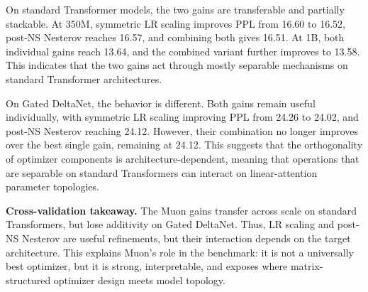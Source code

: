 
On standard Transformer models, the two gains are transferable and partially
stackable. At 350M, symmetric LR scaling improves PPL from 16.60 to 16.52,
post-NS Nesterov reaches 16.57, and combining both gives 16.51. At 1B, both
individual gains reach 13.64, and the combined variant further improves to
13.58. This indicates that the two gains act through mostly separable
mechanisms on standard Transformer architectures.

On Gated DeltaNet, the behavior is different. Both gains remain useful
individually, with symmetric LR scaling improving PPL from 24.26 to 24.02, and
post-NS Nesterov reaching 24.12. However, their combination no longer improves
over the best single gain, remaining at 24.12. This suggests that the
orthogonality of optimizer components is architecture-dependent, meaning that operations
that are separable on standard Transformers can interact on linear-attention
parameter topologies.

\begin{takeaway}
\noindent\textbf{Cross-validation takeaway.}
The Muon gains transfer across scale on standard Transformers, but lose
additivity on Gated DeltaNet. Thus, LR scaling and post-NS Nesterov are useful
refinements, but their interaction depends on the target architecture. This
explains Muon's role in the benchmark: it is not a universally best optimizer,
but it is strong, interpretable, and exposes where matrix-structured optimizer
design meets model topology.
\end{takeaway}